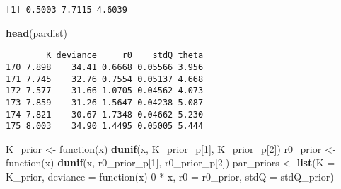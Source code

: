 \documentclass[author-year, review]{elsarticle} %
\newenvironment{Shaded}{}{}
\newcommand{\KeywordTok}[1]{\textcolor[rgb]{0.00,0.44,0.13}{\textbf{{#1}}}}
\newcommand{\DataTypeTok}[1]{\textcolor[rgb]{0.56,0.13,0.00}{{#1}}}
\newcommand{\DecValTok}[1]{\textcolor[rgb]{0.25,0.63,0.44}{{#1}}}
\newcommand{\FloatTok}[1]{\textcolor[rgb]{0.25,0.63,0.44}{{#1}}}
\newcommand{\StringTok}[1]{\textcolor[rgb]{0.25,0.44,0.63}{{#1}}}
\newcommand{\NormalTok}[1]{{#1}}
\begin{document}
\begin{verbatim}
[1] 0.5003 7.7115 4.6039
\end{verbatim}

\begin{Shaded}
\begin{Highlighting}[]
\KeywordTok{head}\NormalTok{(pardist)}
\end{Highlighting}
\end{Shaded}

\begin{verbatim}
        K deviance     r0    stdQ theta
170 7.898    34.41 0.6668 0.05566 3.956
171 7.745    32.76 0.7554 0.05137 4.668
172 7.577    31.66 1.0705 0.04562 4.073
173 7.859    31.26 1.5647 0.04238 5.087
174 7.821    30.67 1.7348 0.04662 5.230
175 8.003    34.90 1.4495 0.05005 5.444
\end{verbatim}

\begin{Shaded}
\end{Shaded}

\begin{Shaded}
\begin{Highlighting}[]
\NormalTok{K_prior     <- function(x) }\KeywordTok{dunif}\NormalTok{(x, K_prior_p[}\DecValTok{1}\NormalTok{], K_prior_p[}\DecValTok{2}\NormalTok{])}
\NormalTok{r0_prior <- function(x) }\KeywordTok{dunif}\NormalTok{(x, r0_prior_p[}\DecValTok{1}\NormalTok{], r0_prior_p[}\DecValTok{2}\NormalTok{])}
\NormalTok{par_priors <- }\KeywordTok{list}\NormalTok{(}\DataTypeTok{K =} \NormalTok{K_prior, }\DataTypeTok{deviance =} \NormalTok{function(x) }\DecValTok{0} \NormalTok{* x, }
                   \DataTypeTok{r0 =} \NormalTok{r0_prior, }\DataTypeTok{stdQ =} \NormalTok{stdQ_prior)}
\end{Highlighting}
\end{Shaded}
\end{document}
